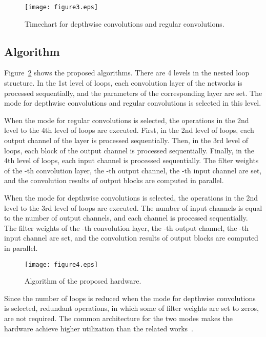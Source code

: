 \documentclass[runningheads]{llncs}
\begin{document}
\begin{figure}
\centering
\texttt{[image: figure3.eps]}
\caption{Timechart for depthwise convolutions and regular convolutions.}
\label{fig:timechart}
\end{figure}

\subsection{Algorithm}
\label{subsec:algorithm}

Figure~\ref{fig:algorithm} shows the proposed algorithms. There are 4 levels in the nested loop structure. In the 1st level of loops, each convolution layer of the networks is processed sequentially, and the parameters of the corresponding layer are set. The mode for depthwise convolutions and regular convolutions is selected in this level.

When the mode for regular convolutions is selected, the operations in the 2nd level to the 4th level of loops are executed. First, in the 2nd level of loops, each output channel of the layer is processed sequentially. Then, in the 3rd level of loops, each block of the output channel is processed sequentially. Finally, in the 4th level of loops, each input channel is processed sequentially. The filter weights of the -th convolution layer, the -th output channel, the -th input channel are set, and the convolution results of  output blocks are computed in parallel. 

When the mode for depthwise convolutions is selected, the operations in the 2nd level to the 3rd level of loops are executed. The number of input channels is equal to the number of output channels, and each channel is processed sequentially. The filter weights of the -th convolution layer, the -th output channel, the -th input channel are set, and the convolution results of  output blocks are computed in parallel. 

\begin{figure}
\centering
\texttt{[image: figure4.eps]}
\caption{Algorithm of the proposed hardware.}
\label{fig:algorithm}
\end{figure}

Since the number of loops is reduced when the mode for depthwise convolutions is selected, redundant operations, in which some of filter weights are set to zeros, are not required. The common architecture for the two modes makes the hardware achieve higher utilization than the related works~\cite{Liu19,Su18}.
\end{document}

